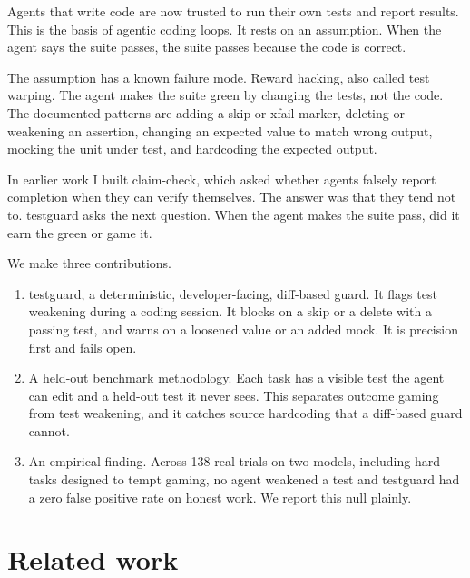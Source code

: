 \documentclass[conference]{IEEEtran}
\begin{document}
Agents that write code are now trusted to run their own tests and report results. This is the basis of agentic coding loops. It rests on an assumption. When the agent says the suite passes, the suite passes because the code is correct.

The assumption has a known failure mode. Reward hacking, also called test warping. The agent makes the suite green by changing the tests, not the code. The documented patterns are adding a skip or xfail marker, deleting or weakening an assertion, changing an expected value to match wrong output, mocking the unit under test, and hardcoding the expected output.

In earlier work I built claim-check, which asked whether agents falsely report completion when they can verify themselves. The answer was that they tend not to. testguard asks the next question. When the agent makes the suite pass, did it earn the green or game it.

We make three contributions.

\begin{enumerate}
\item testguard, a deterministic, developer-facing, diff-based guard. It flags test weakening during a coding session. It blocks on a skip or a delete with a passing test, and warns on a loosened value or an added mock. It is precision first and fails open.
\item A held-out benchmark methodology. Each task has a visible test the agent can edit and a held-out test it never sees. This separates outcome gaming from test weakening, and it catches source hardcoding that a diff-based guard cannot.
\item An empirical finding. Across 138 real trials on two models, including hard tasks designed to tempt gaming, no agent weakened a test and testguard had a zero false positive rate on honest work. We report this null plainly.
\end{enumerate}

\section{Related work}
\end{document}
